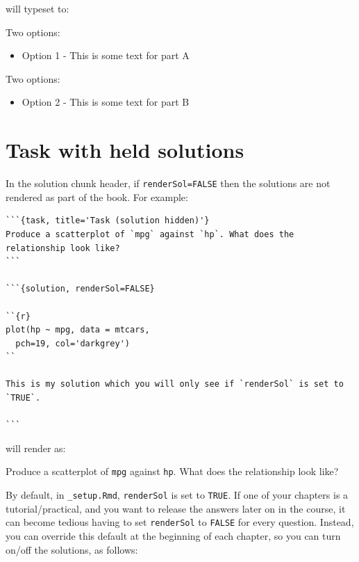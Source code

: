 \documentclass[
  british,
  oneside]{krantz}
\providecommand{\tightlist}{%
  \setlength{\itemsep}{0pt}\setlength{\parskip}{0pt}}
\newcommand{\bblockT}[2][Task]{\begin{tcolorbox}[title = #1 #2, parbox = false]}
\newcommand{\eblockT}{\end{tcolorbox}}
\newcommand{\bmp}{\begin{minipage}[c]{0.5\textwidth}}
\newcommand{\emp}{\end{minipage}}
\newcommand{\bblockST}[1]{\begin{tcolorbox}[title = #1, colframe=taskCol1, breakable, parbox = false]}
\newcommand{\eblockST}{\end{tcolorbox}}
\theoremstyle{definition}
\theoremstyle{definition}
\theoremstyle{definition}
\theoremstyle{definition}
\theoremstyle{remark}
\begin{document}
will typeset to:

\bmp
\bblockST{Part A}

Two options:

\begin{itemize}
\tightlist
\item
  Option 1 - This is some text for part A
\end{itemize}

\eblockST
\emp
\hspace{0.01\textwidth}
\bmp\bblockST{Part B}

Two options:

\begin{itemize}
\tightlist
\item
  Option 2 - This is some text for part B
\end{itemize}

\eblockST
\emp

\hypertarget{task-with-held-solutions}{%
\section{Task with held solutions}\label{task-with-held-solutions}}

In the solution chunk header, if \texttt{renderSol=FALSE} then the solutions are not rendered as part of the book. For example:

\begin{verbatim}
```{task, title='Task (solution hidden)'}
Produce a scatterplot of `mpg` against `hp`. What does the relationship look like?
```

```{solution, renderSol=FALSE}

``{r}
plot(hp ~ mpg, data = mtcars, 
  pch=19, col='darkgrey')
``

This is my solution which you will only see if `renderSol` is set to `TRUE`.

```
\end{verbatim}

will render as:

\hypertarget{tsk7}{}\bblockT[Task (solution hidden)]{\phantomsection\label{sol7}7}

Produce a scatterplot of \texttt{mpg} against \texttt{hp}. What does the relationship look like?
\eblockT

By default, in \texttt{\_setup.Rmd}, \texttt{renderSol} is set to \texttt{TRUE}. If one of your chapters is a tutorial/practical, and you want to release the answers later on in the course,
it can become tedious having to set \texttt{renderSol} to \texttt{FALSE} for every question.
Instead, you can override this default at the beginning of each chapter, so you can turn on/off the solutions, as follows:
\end{document}

